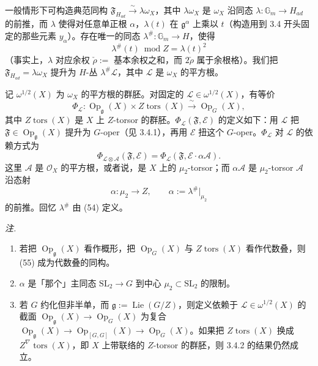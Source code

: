 一般情形下可构造典范同构 $\mathfrak{F}_{H_{ad}}\xrightarrow{\sim}\lambda\omega_{X}$，其中 $\lambda\omega_{X}$ 是 $\omega_{X}$ 沿同态 $\lambda:\mathbb{G}_{m}\to H_{ad}$ 的前推，而 $\lambda$ 使得对任意单正根 $\alpha$，$\lambda(t)$ 在 $\mathfrak{g}^{\alpha}$ 上乘以 $t$（构造用到 3.4 开头固定的那些元素 $y_{\alpha}$）。存在唯一的同态 $\lambda^{\#}:\mathbb{G}_{m}\to H$，使得
\begin{equation}\tag{54}
  \lambda^{\#}(t)\ \operatorname{mod}Z=\lambda(t)^{2}
\end{equation}
（事实上，$\lambda$ 对应余权 $\check{\rho}:=$ 基本余权之和，而 $2\check{\rho}$ 属于余根格）。我们把 $\mathfrak{F}_{H_{ad}}=\lambda\omega_{X}$ 提升为 $H$-丛 $\lambda^{\#}\mathcal{L}$，其中 $\mathcal{L}$ 是 $\omega_{X}$ 的平方根。

 记 $\omega^{1/2}(X)$ 为 $\omega_{X}$ 的平方根的群胚。对固定的 $\mathcal{L}\in\omega^{1/2}(X)$，有等价
\begin{equation}\tag{55}
  \Phi_{\mathcal{L}} : \operatorname{Op}_{\mathfrak{g}}(X)\times Z\operatorname{tors}(X)\xrightarrow{\ \sim\ }\operatorname{Op}_{G}(X),
\end{equation}
其中 $Z\operatorname{tors}(X)$ 是 $X$ 上 $Z$-torsor 的群胚。$\Phi_{\mathcal{L}}(\mathfrak{F},\mathcal{E})$ 的定义如下：用 $\mathcal{L}$ 把 $\mathfrak{F}\in\operatorname{Op}_{\mathfrak{g}}(X)$ 提升为 $G$-oper（见 3.4.1），再用 $\mathcal{E}$ 扭这个 $G$-oper。$\Phi_{\mathcal{L}}$ 对 $\mathcal{L}$ 的依赖方式为
\[
  \Phi_{\mathcal{L}\otimes\mathcal{A}}(\mathfrak{F},\mathcal{E})=\Phi_{\mathcal{L}}(\mathfrak{F},\mathcal{E}\cdot\alpha\mathcal{A}).
\]
这里 $\mathcal{A}$ 是 $\mathcal{O}_{X}$ 的平方根，或者说，是 $X$ 上的 $\mu_{2}$-torsor；而 $\alpha\mathcal{A}$ 是 $\mu_{2}$-torsor $\mathcal{A}$ 沿态射
\begin{equation}\tag{56}
  \alpha : \mu_{2}\longrightarrow Z,\qquad \alpha:=\lambda^{\#}|_{\mu_{2}}
\end{equation}
的前推。回忆 $\lambda^{\#}$ 由 (54) 定义。

\emph{注.}
\begin{enumerate}[label=(\roman*),leftmargin=2.2em]
  \item 若把 $\operatorname{Op}_{\mathfrak{g}}(X)$ 看作概形，把 $\operatorname{Op}_{G}(X)$ 与 $Z\operatorname{tors}(X)$ 看作代数叠，则 (55) 成为代数叠的同构。
  \item $\alpha$ 是「那个」主同态 $\mathrm{SL}_{2}\to G$ 到中心 $\mu_{2}\subset\mathrm{SL}_{2}$ 的限制。

  \item 若 $G$ 约化但非半单，而 $\mathfrak{g}:=\operatorname{Lie}(G/Z)$，则定义依赖于 $\mathcal{L}\in\omega^{1/2}(X)$ 的截面 $\operatorname{Op}_{\mathfrak{g}}(X)\to\operatorname{Op}_{G}(X)$ 为复合 $\operatorname{Op}_{\mathfrak{g}}(X)\to\operatorname{Op}_{[G,G]}(X)\to\operatorname{Op}_{G}(X)$。如果把 $Z\operatorname{tors}(X)$ 换成 $Z^{\nabla}\operatorname{tors}(X)$，即 $X$ 上带联络的 $Z$-torsor 的群胚，则 3.4.2 的结果仍然成立。
\end{enumerate}

